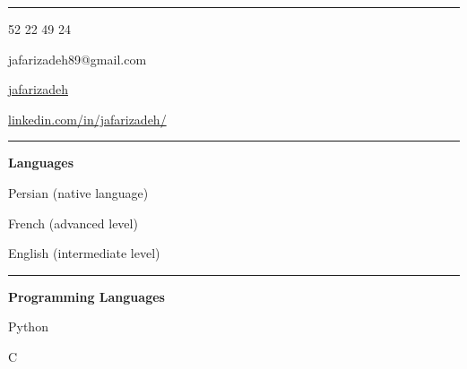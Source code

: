 \documentclass[a4paper]{letter}
\newcommand{\divider}{\rule{\linewidth}{0.9pt}}
\begin{document}
\begin{minipage}[t]{0.30\textwidth}
\setlength{\baselineskip}{1\baselineskip}
\color{white}
\vspace{5mm}




\vspace{5mm}

\divider


\faPhone {} 52 22 49 24

\faEnvelope \quad jafarizadeh89@gmail.com

\faGithub \quad \href{https://github.com/jafarizadeh}{jafarizadeh}

\faLinkedin \quad \href{https://www.linkedin.com/in/jafarizadeh/}{linkedin.com/in/jafarizadeh/}


\divider

{\large \textbf{Languages}}

\faCircleNotch \quad Persian (native language)

\faCircleNotch \quad French (advanced level)

\faCircleNotch \quad English (intermediate level)

\divider


{\large \textbf{Programming Languages}}

\faCircleNotch \quad Python

\faCircleNotch \quad C


\end{minipage}
\end{document}
